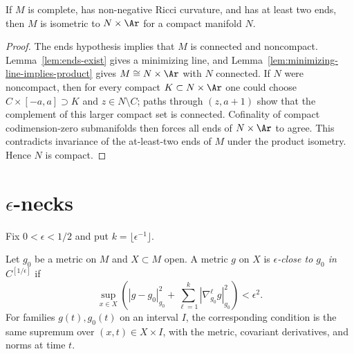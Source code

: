 \begin{theorem}
\label{thm:splitting-theorem}
\label{splitting}


If $M$ is complete, has non-negative Ricci curvature, and has at least
two ends, then $M$ is isometric to $N\times\Ar$ for a compact manifold
$N$.
\end{theorem}
\begin{proof}
\sketch
{}
The ends hypothesis implies that $M$ is connected and noncompact.
Lemma~\ref{lem:ends-exist} gives a minimizing line, and
Lemma~\ref{lem:minimizing-line-implies-product} gives
$M\cong N\times\Ar$ with $N$ connected. If $N$ were noncompact, then
for every compact $K\subset N\times\Ar$ one could choose
$C\times[-a,a]\supset K$ and $z\in N\setminus C$; paths through
$(z,a+1)$ show that the complement of this larger compact set is
connected. Cofinality of compact codimension-zero submanifolds then
forces all ends of $N\times\Ar$ to agree. This contradicts invariance of
the at-least-two ends of $M$ under the product isometry. Hence $N$ is
compact.
\end{proof}

\section{$\epsilon$-necks}

Fix $0<\epsilon<1/2$ and put $k=\lfloor\epsilon^{-1}\rfloor$.

\begin{definition}
\label{def:epsilon-close-topology}
\leanok
\label{epsclose}

Let $g_0$ be a metric on $M$ and $X\subset M$ open. A metric $g$ on
$X$ is \emph{$\epsilon$-close to $g_0$ in $C^{[1/\epsilon]}$} if
\begin{equation}\label{eqnepsclose}
\sup_{x\in X}\left(|g-g_0|_{g_0}^2
+\sum_{\ell=1}^k|\nabla_{g_0}^\ell g|_{g_0}^2\right)<\epsilon^2.
\end{equation}
For families $g(t),g_0(t)$ on an interval $I$, the corresponding
condition is the same supremum over $(x,t)\in X\times I$, with the
metric, covariant derivatives, and norms at time $t$.
\end{definition}

